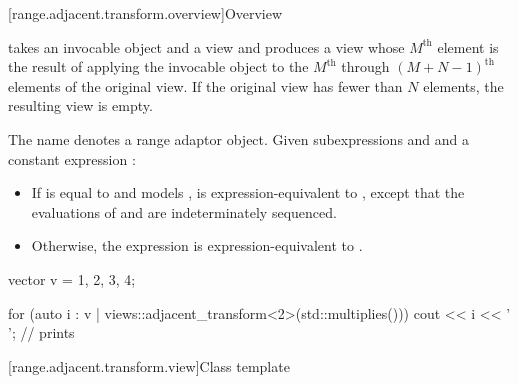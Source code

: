 [range.adjacent.transform.overview]{Overview}

\pnum
{} takes an invocable object and
a view and produces a view
whose $M^\text{th}$ element is the result of applying the invocable object
to the $M^\text{th}$ through $(M + N - 1)^\text{th}$ elements
of the original view.
If the original view has fewer than $N$ elements, the resulting view is empty.

\pnum
{}%
The name  denotes
a range adaptor object.
Given subexpressions  and  and
a constant expression :
\begin{itemize}
\item
If  is equal to  and
 models ,
 is expression-equivalent to
,
except that the evaluations of  and  are
indeterminately sequenced.
\item
Otherwise,
the expression  is
expression-equivalent to
.
\end{itemize}

\pnum
\begin{example}
\begin{codeblock}
vector v = {1, 2, 3, 4};

for (auto i : v | views::adjacent_transform<2>(std::multiplies())) {
  cout << i << ' ';     // prints 
}
\end{codeblock}
\end{example}

[range.adjacent.transform.view]{Class template }

